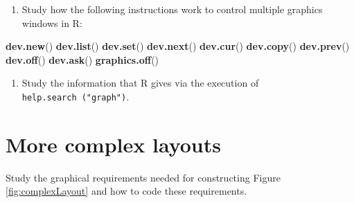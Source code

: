 \documentclass[
]{book}
\newenvironment{Shaded}{\begin{snugshade}}{\end{snugshade}}
\newcommand{\FunctionTok}[1]{\textcolor[rgb]{0.13,0.29,0.53}{\textbf{#1}}}
\newcommand{\NormalTok}[1]{#1}
\providecommand{\tightlist}{%
  \setlength{\itemsep}{0pt}\setlength{\parskip}{0pt}}
\begin{document}
\begin{enumerate}
\def\labelenumi{(\alph{enumi})}
\tightlist
\item
  Study how the following instructions work to control multiple graphics windows in R:
\end{enumerate}

\begin{Shaded}
\begin{Highlighting}[]
\FunctionTok{dev.new}\NormalTok{() }
\FunctionTok{dev.list}\NormalTok{()  }
\FunctionTok{dev.set}\NormalTok{()   }
\FunctionTok{dev.next}\NormalTok{()}
\FunctionTok{dev.cur}\NormalTok{()   }
\FunctionTok{dev.copy}\NormalTok{()  }
\FunctionTok{dev.prev}\NormalTok{()}
\FunctionTok{dev.off}\NormalTok{()   }
\FunctionTok{dev.ask}\NormalTok{()   }
\FunctionTok{graphics.off}\NormalTok{()}
\end{Highlighting}
\end{Shaded}

\begin{enumerate}
\def\labelenumi{(\alph{enumi})}
\setcounter{enumi}{1}
\tightlist
\item
  Study the information that R gives via the execution of \texttt{help.search\ ("graph")}.
\end{enumerate}

\section{More complex layouts}\label{more-complex-layouts}

Study the graphical requirements needed for constructing Figure \ref{fig:complexLayout} and how to code these requirements.
\end{document}
